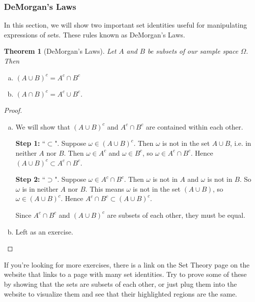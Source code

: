 \documentclass[11pt,letterpaper]{article}
\newtheorem{theorem}{Theorem}
\numberwithin{theorem}{section}
\numberwithin{definition}{section}
\numberwithin{lemma}{section}
\numberwithin{corollary}{section}
\numberwithin{proposition}{section}
\theoremstyle{definition}
\numberwithin{remark}{section}
\numberwithin{claim}{section}
\numberwithin{observation}{section}
\numberwithin{fact}{section}
\numberwithin{assumption}{section}
\numberwithin{example}{section}
\numberwithin{exercise}{section}
\begin{document}
\subsubsection{DeMorgan's Laws}
In this section, we will show two important set identities useful for manipulating expressions of sets. These rules known as DeMorgan's Laws. 

\begin{theorem}[DeMorgan's Laws]
Let $A$ and $B$ be subsets of our sample space $\Omega$. Then
\begin{enumerate}[(a)]
\item $(A \cup B)^c = A^c \cap B^c$

\item $(A \cap B)^c = A^c \cup B^c$.
\end{enumerate}
\end{theorem}

\begin{proof}
$ $
\begin{enumerate}[(a)]
\item We will show that $(A \cup B)^c$ and $A^c \cap B^c$ are contained within each other.

\textbf{Step 1:} ``$\subset$". Suppose $\omega \in (A \cup B)^c$. Then $\omega$ is not in the set $A \cup B$, i.e. in neither $A$ nor $B$. Then $\omega \in A^c$ and $\omega \in B^c$, so $\omega \in A^c \cap B^c$. Hence $(A \cup B)^c \subset A^c \cap B^c$.

\textbf{Step 2:} ``$\supset$". Suppose $\omega \in A^c \cap B^c$. Then $\omega$ is not in $A$ and $\omega$ is not in $B$. So $\omega$ is in neither $A$ nor $B$. This means $\omega$ is not in the set $(A \cup B)$, so $\omega \in (A \cup B)^c$. Hence $A^c \cap B^c \subset (A \cup B)^c$.

Since $A^c \cap B^c$ and $(A \cup B)^c$ are subsets of each other, they must be equal.

\item Left as an exercise. 
\end{enumerate}
\end{proof}

If you're looking for more exercises, there is a link on the Set Theory page on the website that links to a page with many set identities. Try to prove some of these by showing that the sets are subsets of each other, or just plug them into the website to visualize them and see that their highlighted regions are the same.

\newpage
\end{document}
